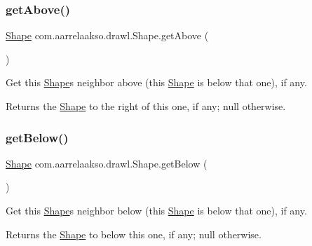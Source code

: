 \subsubsection{\texorpdfstring{get\+Above()}{getAbove()}}
{\footnotesize\ttfamily \hyperlink{classcom_1_1aarrelaakso_1_1drawl_1_1_shape}{Shape} com.\+aarrelaakso.\+drawl.\+Shape.\+get\+Above (\begin{DoxyParamCaption}{ }\end{DoxyParamCaption})\hspace{0.3cm}{\ttfamily [inherited]}}

Get this \hyperlink{classcom_1_1aarrelaakso_1_1drawl_1_1_shape}{Shape}\textquotesingle{}s neighbor above (this \hyperlink{classcom_1_1aarrelaakso_1_1drawl_1_1_shape}{Shape} is below that one), if any.

\begin{DoxyReturn}{Returns}
the \hyperlink{classcom_1_1aarrelaakso_1_1drawl_1_1_shape}{Shape} to the right of this one, if any; {\ttfamily null} otherwise. 
\end{DoxyReturn}
\mbox{\label{classcom_1_1aarrelaakso_1_1drawl_1_1_shape_a53de5ab609d879719cd3b372dfe8df58}} 
\subsubsection{\texorpdfstring{get\+Below()}{getBelow()}}
{\footnotesize\ttfamily \hyperlink{classcom_1_1aarrelaakso_1_1drawl_1_1_shape}{Shape} com.\+aarrelaakso.\+drawl.\+Shape.\+get\+Below (\begin{DoxyParamCaption}{ }\end{DoxyParamCaption})\hspace{0.3cm}{\ttfamily [inherited]}}

Get this \hyperlink{classcom_1_1aarrelaakso_1_1drawl_1_1_shape}{Shape}\textquotesingle{}s neighbor below (this \hyperlink{classcom_1_1aarrelaakso_1_1drawl_1_1_shape}{Shape} is below that one), if any.

\begin{DoxyReturn}{Returns}
the \hyperlink{classcom_1_1aarrelaakso_1_1drawl_1_1_shape}{Shape} to below this one, if any; {\ttfamily null} otherwise. 
\end{DoxyReturn}
\mbox{\label{classcom_1_1aarrelaakso_1_1drawl_1_1_shape_aa3857406bc4f6c7373f1cd7cbe16dfd9}} 
